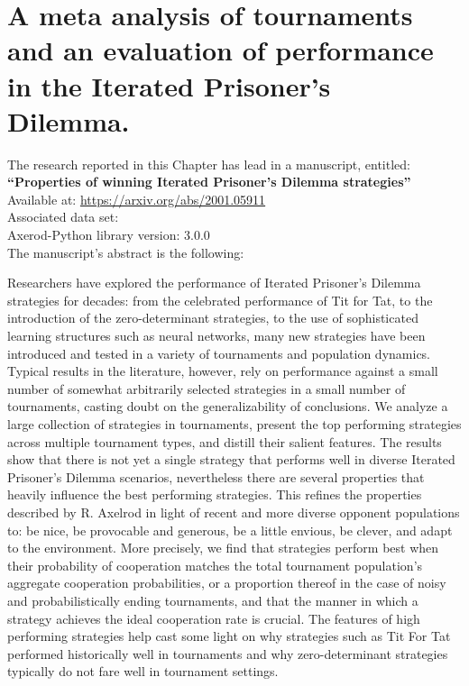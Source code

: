 \chapter{A meta analysis of tournaments and an evaluation of performance in the
Iterated Prisoner's Dilemma.}\label{chapter:meta_tournaments}

\begin{center}
    The research reported in this Chapter has lead in a manuscript, entitled: \\
    \textbf{``Properties of winning Iterated Prisoner's Dilemma strategies''} \\
    Available at: \url{https://arxiv.org/abs/2001.05911} \\
    Associated data set: \cite{Glynatsi2019_meta, Glynatsi2019_meta_raw_data} \\
    Axerod-Python library version: 3.0.0 \\ \vspace{.5cm}
    The manuscript's abstract is the following:
\end{center}

Researchers have explored the performance of Iterated Prisoner's Dilemma strategies
for decades: from the celebrated performance of Tit for Tat, to the
introduction of the zero-determinant strategies, to the use of sophisticated learning
structures such as neural networks, many new strategies have been introduced and tested
in a variety of tournaments and population dynamics. Typical results in the literature,
however, rely on performance against a small number of somewhat arbitrarily selected
strategies in a small number of tournaments, casting doubt on the generalizability
of conclusions. We analyze a large collection of \numberofstrategies
strategies in \numberofalltournaments tournaments, present the top performing strategies across multiple
tournament types, and distill their salient features.
The results show that there is not yet a single
strategy that performs well in diverse Iterated Prisoner's Dilemma scenarios,
nevertheless there are several properties that heavily influence the best performing
strategies. This refines the properties described by R. Axelrod in light of
recent and more diverse opponent populations to: be nice, be provocable and generous,
be a little envious, be clever, and adapt to the environment. More precisely,
we find that strategies perform best when their probability of cooperation
matches the total tournament population's aggregate cooperation probabilities,
or a proportion thereof in the case of noisy and probabilistically ending tournaments,
and that the manner in which a strategy achieves the ideal cooperation rate is crucial.
The features of high performing strategies help cast some light on why strategies such as Tit For Tat
performed historically well in tournaments and why zero-determinant strategies
typically do not fare well in tournament settings.

